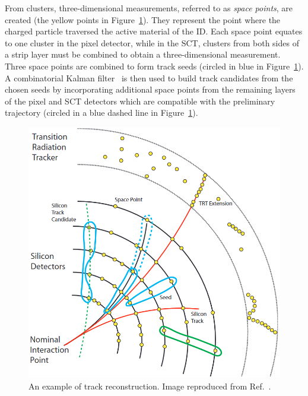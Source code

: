 From clusters, three-dimensional measurements, referred to as
\textit{space points}, are created (the yellow points in Figure~\ref{fig:track_recon}). 
They represent the point where the charged particle 
traversed the active material of the ID. 
Each space point equates to one cluster in the pixel detector, while in the SCT, 
clusters from both sides of a strip layer must be combined 
to obtain a three-dimensional measurement.
Three space points are combined to form track seeds 
(circled in blue in Figure~\ref{fig:track_recon}). 
A combinatorial Kalman filter~\cite{FRUHWIRTH1987444} is then used to 
build track candidates from the chosen seeds by incorporating additional 
space points from the remaining layers of the pixel and SCT detectors which 
are compatible with the preliminary trajectory 
(circled in a blue dashed line in Figure~\ref{fig:track_recon}). 
\begin{figure}[bht]
    \begin{centering}	
    \includegraphics[width=.8\textwidth]{Reconstruction/plots/track.png}
    \caption{An example of track reconstruction. 
    Image reproduced from Ref.~\cite{ATLAS-CONF-2010-072}.
        }
    \label{fig:track_recon}
    \end{centering}
\end{figure}
